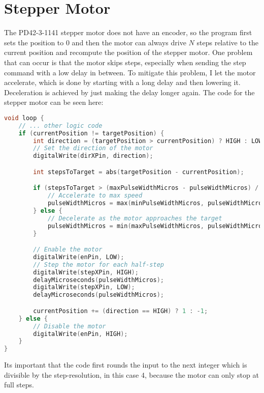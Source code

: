 \section{Stepper Motor}\label{sec:stepper-motor}
The PD42-3-1141 stepper motor does not have an encoder, so the program first sets the position to $0$ and then the motor can always drive $N$ steps relative to the current position and recompute the position of the stepper motor.
One problem that can occur is that the motor skips steps, especially when sending the step command with a low delay in between.
To mitigate this problem, I let the motor accelerate, which is done by starting with a long delay and then lowering it.
Deceleration is achieved by just making the delay longer again.
The code for the stepper motor can be seen here:
\begin{lstlisting}[language=cpp,breaklines,label={lst:stepper-motor}]
void loop {
    // ... other logic code
    if (currentPosition != targetPosition) {
        int direction = (targetPosition > currentPosition) ? HIGH : LOW;
        // Set the direction of the motor
        digitalWrite(dirXPin, direction);

        int stepsToTarget = abs(targetPosition - currentPosition);

        if (stepsToTarget > (maxPulseWidthMicros - pulseWidthMicros) / acc) {
            // Accelerate to max speed
            pulseWidthMicros = max(minPulseWidthMicros, pulseWidthMicros - acc);
        } else {
            // Decelerate as the motor approaches the target
            pulseWidthMicros = min(maxPulseWidthMicros, pulseWidthMicros + acc);
        }

        // Enable the motor
        digitalWrite(enPin, LOW);
        // Step the motor for each half-step
        digitalWrite(stepXPin, HIGH);
        delayMicroseconds(pulseWidthMicros);
        digitalWrite(stepXPin, LOW);
        delayMicroseconds(pulseWidthMicros);

        currentPosition += (direction == HIGH) ? 1 : -1;
    } else {
        // Disable the motor
        digitalWrite(enPin, HIGH);
    }
}
\end{lstlisting}
Its important that the code first rounds the input to the next integer which is divisible by the step-resolution, in this case 4, because the motor can only stop at full steps.\\
\vspace{0.5cm}\\
